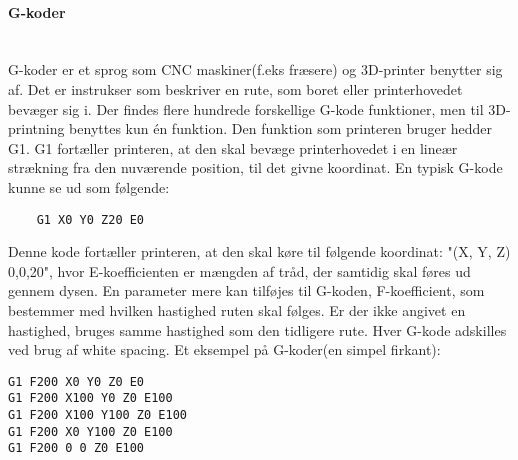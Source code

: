 
\paragraph{G-koder} \hspace*{\fill} \\ %
G-koder er et sprog som CNC maskiner(f.eks fræsere) og 3D-printer benytter sig af. Det er instrukser som beskriver en rute, som boret eller printerhovedet bevæger sig i. \cite{gkode} 
Der findes flere hundrede forskellige G-kode funktioner, men til 3D-printning benyttes kun én funktion. Den funktion som printeren bruger hedder G1. G1 fortæller printeren, at den skal bevæge printerhovedet i en lineær strækning fra den nuværende position, til det givne koordinat.
En typisk G-kode kunne se ud som følgende: 

\begin{verbatim}
	G1 X0 Y0 Z20 E0
\end{verbatim}


Denne kode fortæller printeren, at den skal køre til følgende koordinat: "(X, Y, Z) 0,0,20", hvor E-koefficienten er mængden af tråd, der samtidig skal føres ud gennem dysen.
En parameter mere kan tilføjes til G-koden, F-koefficient, som bestemmer med hvilken hastighed ruten skal følges. Er der ikke angivet en hastighed, bruges samme hastighed som den tidligere rute. 
Hver G-kode adskilles ved brug af white spacing.
Et eksempel på G-koder(en simpel firkant):
\begin{lstlisting}
G1 F200 X0 Y0 Z0 E0
G1 F200 X100 Y0 Z0 E100
G1 F200 X100 Y100 Z0 E100
G1 F200 X0 Y100 Z0 E100
G1 F200 0 0 Z0 E100
\end{lstlisting}